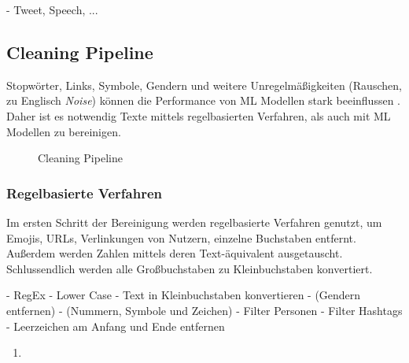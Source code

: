- Tweet, Speech, ...

\subsection{Cleaning Pipeline} \label{subsec:cleaningPipeline}

Stopwörter, Links, Symbole, Gendern und weitere Unregelmäßigkeiten (Rauschen, zu Englisch \textit{Noise}) können die Performance von \ac{ML} Modellen stark beeinflussen \autocite[4]{kowsari_text_2019}. Daher ist es notwendig Texte mittels regelbasierten Verfahren, als auch mit \ac{ML} Modellen zu bereinigen. 


\begin{figure}[H]
    \centering
    \caption{Cleaning Pipeline} \label{fig:cleaningPipeline}
\end{figure}

\subsubsection{Regelbasierte Verfahren}

Im ersten Schritt der Bereinigung werden regelbasierte Verfahren genutzt, um Emojis, \acp{URL}, Verlinkungen von Nutzern, einzelne Buchstaben entfernt. Außerdem werden Zahlen mittels deren Text-äquivalent ausgetauscht. Schlussendlich werden alle Großbuchstaben zu Kleinbuchstaben konvertiert. 

- RegEx
    - Lower Case
    - Text in Kleinbuchstaben konvertieren
    - (Gendern entfernen)
    - (Nummern, Symbole und Zeichen)
    - Filter Personen
    - Filter Hashtags
    - Leerzeichen am Anfang und Ende entfernen

\begin{enumerate}
    \item 
\end{enumerate}


